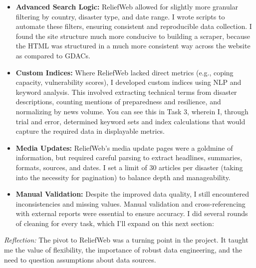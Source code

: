 \documentclass[12pt]{article}
\begin{document}
\begin{itemize}
    \item \textbf{Advanced Search Logic:} ReliefWeb allowed for slightly more granular filtering by country, disaster type, and date range. I wrote scripts to automate these filters, ensuring consistent and reproducible data collection. I found the site structure much more conducive to building a scraper, because the HTML was structured in a much more consistent way across the website as compared to GDACs.
    \item \textbf{Custom Indices:} Where ReliefWeb lacked direct metrics (e.g., coping capacity, vulnerability scores), I developed custom indices using NLP and keyword analysis. This involved extracting technical terms from disaster descriptions, counting mentions of preparedness and resilience, and normalizing by news volume. You can see this in Task 3, wherein I, through trial and error, determined keyword sets and index calculations that would capture the required data in displayable metrics.
    \item \textbf{Media Updates:} ReliefWeb's media update pages were a goldmine of information, but required careful parsing to extract headlines, summaries, formats, sources, and dates. I set a limit of 30 articles per disaster (taking into the necessity for pagination) to balance depth and manageability.
    \item \textbf{Manual Validation:} Despite the improved data quality, I still encountered inconsistencies and missing values. Manual validation and cross-referencing with external reports were essential to ensure accuracy. I did several rounds of cleaning for every task, which I'll expand on this next section:
\end{itemize}

\textit{Reflection:} The pivot to ReliefWeb was a turning point in the project. It taught me the value of flexibility, the importance of robust data engineering, and the need to question assumptions about data sources.
\end{document}
